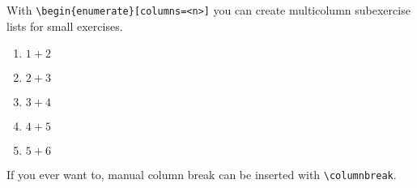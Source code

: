 \documentclass[german]{mhexsheet}
\begin{document}
\maketitle

\begin{exercise}[points=10]
With \verb|\begin{enumerate}[columns=<n>]| you can create multicolumn subexercise lists for small exercises.
\begin{enumerate}[columns=3]
  \item $1+2$
  \item $2+3$
  \item $3+4$
  \item $4+5$
  \item $5+6$
\end{enumerate}
If you ever want to, manual column break can be inserted with \verb|\columnbreak|.
\end{exercise}

\begin{solution}[points=3+3+4]


\end{solution}

\begin{exercise}
\end{exercise}
\end{document}
